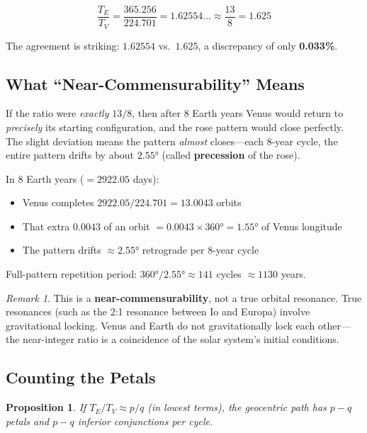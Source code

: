 \documentclass[11pt,letterpaper]{article}
\theoremstyle{definition}
\theoremstyle{plain}
\newtheorem{proposition}{Proposition}[section]
\theoremstyle{remark}
\newtheorem{remark}{Remark}[section]
\begin{document}
\begin{equation}
  \frac{T_E}{T_V}
  = \frac{365.256}{224.701}
  = 1.62554\ldots
  \approx \frac{13}{8} = 1.625
  \label{eq:ratio}
\end{equation}

The agreement is striking: $1.62554$ vs.\ $1.625$, a discrepancy
of only \textbf{0.033\%}.

\subsection{What ``Near-Commensurability'' Means}

If the ratio were \textit{exactly} $13/8$, then after 8 Earth
years Venus would return to \textit{precisely} its starting
configuration, and the rose pattern would close perfectly. The
slight deviation means the pattern \textit{almost} closes—each
8-year cycle, the entire pattern drifts by about $2.55°$ (called
\textbf{precession} of the rose).

\begin{keyresult}
In 8 Earth years ($= 2922.05$ days):
\begin{itemize}[nosep]
  \item Venus completes $2922.05 / 224.701 = 13.0043$ orbits
  \item That extra $0.0043$ of an orbit $= 0.0043 \times 360° = 1.55°$ of Venus longitude
  \item The pattern drifts $\approx 2.55°$ retrograde per 8-year cycle
\end{itemize}
Full-pattern repetition period: $360° / 2.55° \approx 141$ cycles
$\approx 1130$ years.
\end{keyresult}

\begin{remark}
This is a \textbf{near-commensurability}, not a true orbital
resonance. True resonances (such as the 2:1 resonance between
Io and Europa) involve gravitational locking. Venus and Earth
do not gravitationally lock each other—the near-integer ratio
is a coincidence of the solar system's initial conditions.
\end{remark}

\subsection{Counting the Petals}

\begin{proposition}
If $T_E / T_V \approx p/q$ (in lowest terms), the geocentric
path has $p - q$ petals and $p - q$ inferior conjunctions per
cycle.
\end{proposition}
\end{document}
